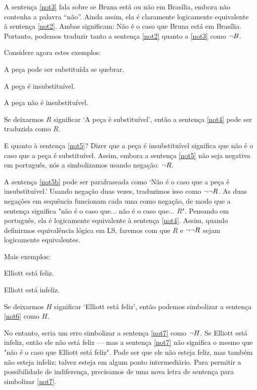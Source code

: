 A sentença \ref{not3} fala sobre se Bruna está ou não em Brasília, embora não contenha a palavra ``não''. Ainda assim, ela é claramente logicamente equivalente à sentença \ref{not2}. Ambas significam: Não é o caso que Bruna está em Brasília. Portanto, podemos traduzir tanto a sentença \ref{not2} quanto a \ref{not3} como $\neg B$.


Considere agora estes exemplos:
\begin{earg}
\item[\ex{not4}] A peça pode ser substituída se quebrar.
\item[\ex{not5}] A peça é insubstituível.
\item[\ex{not5b}] A peça não é insubstituível.
\end{earg}

Se deixarmos $R$ significar `A peça é substituível', então a sentença \ref{not4} pode ser traduzida como $R$.

E quanto à sentença \ref{not5}? Dizer que a peça é insubstituível significa que não é o caso que a peça é substituível. Assim, embora a sentença \ref{not5} não seja negativa em português, nós a simbolizamos usando negação: $\neg R$.

A sentença \ref{not5b} pode ser parafraseada como `Não é o caso que a peça é insubstituível.' Usando negação duas vezes, traduzimos isso como $\neg\neg R$. As duas negações em sequência funcionam cada uma como negação, de modo que a sentença significa "não é o caso que$\ldots$ não é o caso que$\ldots$ $R$". Pensando em português, ela é logicamente equivalente à sentença \ref{not4}. Assim, quando definirmos equivalência lógica em LS, faremos com que $R$ e $\neg\neg R$ sejam logicamente equivalentes.

Mais exemplos:
\begin{earg}
\item[\ex{not6}] Elliott está feliz.
\item[\ex{not7}] Elliott está infeliz.
\end{earg}

Se deixarmos $H$ significar `Elliott está feliz', então podemos simbolizar a sentença \ref{not6} como $H$.

No entanto, seria um erro simbolizar a sentença \ref{not7} como $\neg H$. Se Elliott está infeliz, então ele não está feliz — mas a sentença \ref{not7} não significa o mesmo que "não é o caso que Elliott está feliz". Pode ser que ele não esteja feliz, mas também não esteja infeliz; talvez esteja em algum ponto intermediário. Para permitir a possibilidade de indiferença, precisamos de uma nova letra de sentença para simbolizar \ref{not7}.

